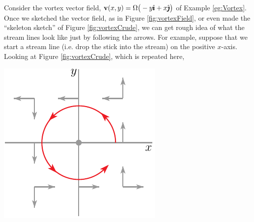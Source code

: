 \begin{eg}
\label{eg:flowSketchVortex}
Consider the vortex vector field, $\mathbf{v}(x,y) = \Omega\big(-y\hat{\pmb{\imath}} +x\hat{\pmb{\jmath}}\big)$ 
of Example \ref{eg:Vortex}. Once we sketched the vector field, as in
Figure \ref{fig:vortexField}, or even made the ``skeleton sketch'' of
Figure \ref{fig:vortexCrude}, we can get rough idea of what the stream lines 
look like just by following the arrows. For example, suppose that
we start a stream line (i.e. drop the stick into the stream) on the positive
$x$-axis. Looking at Figure \ref{fig:vortexCrude}, which is repeated
here,

\begin{efig}
\begin{center}
    \includegraphics{phaseVortex2.pdf}
\end{center}
\end{efig}


\end{eg}
